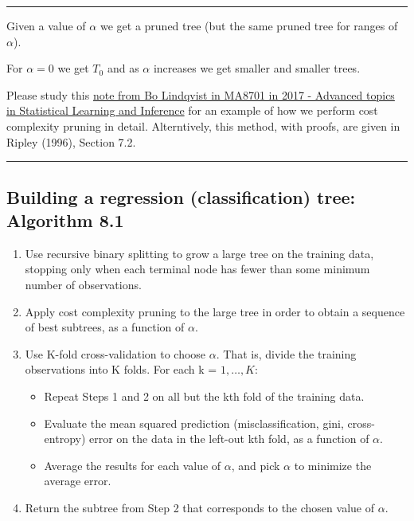 \documentclass[]{article}
\providecommand{\tightlist}{%
  \setlength{\itemsep}{0pt}\setlength{\parskip}{0pt}}
\begin{document}
\begin{center}\rule{0.5\linewidth}{\linethickness}\end{center}

Given a value of \(\alpha\) we get a pruned tree (but the same pruned
tree for ranges of \(\alpha\)).

For \(\alpha=0\) we get \(T_0\) and as \(\alpha\) increases we get
smaller and smaller trees.

Please study this
\href{https://www.math.ntnu.no/emner/TMA4268/2018v/notes/CART1MA87012017BoLindqvist.pdf}{note
from Bo Lindqvist in MA8701 in 2017 - Advanced topics in Statistical
Learning and Inference} for an example of how we perform cost complexity
pruning in detail. Alterntively, this method, with proofs, are given in
Ripley (1996), Section 7.2.

\begin{center}\rule{0.5\linewidth}{\linethickness}\end{center}

\hypertarget{building-a-regression-classification-tree-algorithm-8.1}{%
\subsection{Building a regression (classification) tree: Algorithm
8.1}\label{building-a-regression-classification-tree-algorithm-8.1}}

\begin{enumerate}
\def\labelenumi{\arabic{enumi}.}
\tightlist
\item
  Use recursive binary splitting to grow a large tree on the training
  data, stopping only when each terminal node has fewer than some
  minimum number of observations.
\item
  Apply cost complexity pruning to the large tree in order to obtain a
  sequence of best subtrees, as a function of \(\alpha\).
\item
  Use K-fold cross-validation to choose \(\alpha\). That is, divide the
  training observations into K folds. For each k = \(1,\ldots, K\):

  \begin{itemize}
  \tightlist
  \item
    Repeat Steps 1 and 2 on all but the kth fold of the training data.
  \item
    Evaluate the mean squared prediction (misclassification, gini,
    cross-entropy) error on the data in the left-out kth fold, as a
    function of \(\alpha\).
  \item
    Average the results for each value of \(\alpha\), and pick
    \(\alpha\) to minimize the average error.
  \end{itemize}
\item
  Return the subtree from Step 2 that corresponds to the chosen value of
  \(\alpha\).
\end{enumerate}
\end{document}
